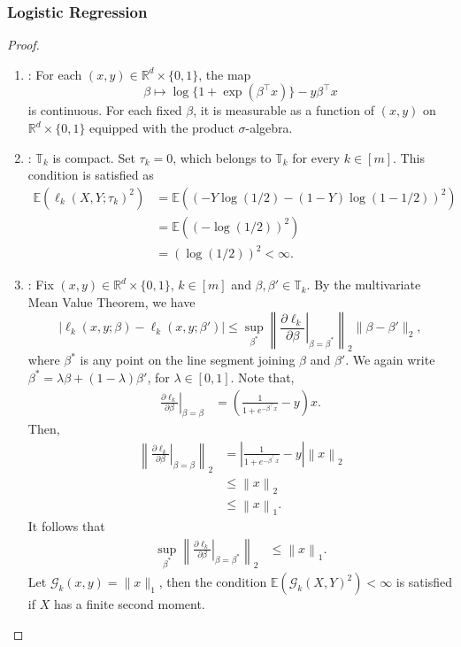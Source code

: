 \documentclass[12pt]{article}
\newcommand{\blue}[1]{\textcolor[rgb]{0.00,0.00,1.00}{#1}}
\theoremstyle{remark}
\theoremstyle{plain}
\begin{document}
\subsubsection{Logistic Regression}
\begin{proof}
    \begin{enumerate}
    \item[A1]: For each $(x,y)\in\mathbb R^d\times\{0,1\}$, the map
    \[
    \beta\mapsto \log\{1+\exp(\beta^\top x)\}-y\beta^\top x
    \]
    is continuous. For each fixed $\beta$, it is measurable as a function of $(x,y)$ on $\mathbb R^d\times\{0,1\}$ equipped with the product $\sigma$-algebra.
    \item[A2]: $\mathbb{T}_k$ is compact. Set $\tau_k=0$, which belongs to $\mathbb{T}_k$ for every $k\in[m]$. This condition is satisfied as
    \begin{align*}
        \mathbb{E}\left(\ell_k(X, Y; \tau_k)^2\right) &= \mathbb{E}\left(\left(-Y \log(1/2) - (1-Y)\log(1-1/2)\right)^2\right)\\
        &= \mathbb{E}\left(\left(-\log(1/2)\right)^2\right)\\
        &= (\log(1/2))^2 < \infty.
    \end{align*}
    \item[A3]: Fix \blue{$(x,y)\in \mathbb R^d\times\{0,1\}$}, $k \in \left[m\right]$ and $\beta, \beta'\in \mathbb{T}_k$. By the multivariate Mean Value Theorem, we have
    \[|\ell_k(x, y; \beta) - \ell_k(x, y; \beta')| \leq \sup_{\beta^*} \left\lVert \left. \frac{\partial \ell_k}{\partial \beta}\right|_{\beta = \beta^*} \right \rVert_2 \lVert \beta - \beta'\rVert_2, \]
    where $\beta^*$ is any point on the line segment joining $\beta$ and $\beta'$. We again write $\beta^* = \lambda\beta + (1 - \lambda)\beta'$, for $\lambda\in\left[0, 1\right]$. Note that,
    \begin{align*}
        \left.\frac{\partial \ell_k}{\partial \beta}\right|_{\beta = \beta} &= \left(\frac{1}{1 + e^{-\beta^\top x}} - y\right)x.
    \end{align*}
    Then,
    \begin{align*}
        \left\lVert \left. \frac{\partial \ell_k}{\partial \beta}\right|_{\beta = \beta} \right \rVert_2 &= \left\lvert \frac{1}{1 + e^{-\beta^\top x}} - y \right\rvert \left\lVert x\right\rVert_2\\
        &\leq \left\lVert x\right\rVert_2\\
        &\leq \left\lVert x\right\rVert_1.
    \end{align*}
    It follows that
    \begin{align*}
        \sup_{\beta^*} \left\lVert \left. \frac{\partial \ell_k}{\partial \beta}\right|_{\beta = \beta^*} \right \rVert_2 &\leq \left\lVert x\right\rVert_1.
    \end{align*}
    Let $\mathcal{G}_k(x, y) = \lVert x\rVert_1$, then the condition $\mathbb{E}\left(\mathcal{G}_k(X, Y)^2\right) < \infty$ is satisfied if $X$ has a finite second moment.
\end{enumerate}
\end{proof}
\end{document}
